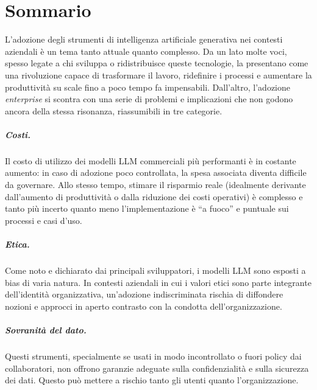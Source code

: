 
\chapter*{Sommario}

L'adozione degli strumenti di intelligenza artificiale generativa nei contesti
aziendali è un tema tanto attuale quanto complesso. Da un lato molte voci, 
spesso legate a chi sviluppa o ridistribuisce queste tecnologie, la
presentano come una rivoluzione capace di trasformare il lavoro, ridefinire i
processi e aumentare la produttività su scale fino a poco tempo fa impensabili.
Dall'altro, l'adozione \emph{enterprise} si scontra con una serie di problemi e
implicazioni che non godono ancora della stessa risonanza, riassumibili in tre categorie.

\paragraph{Costi.} Il costo di utilizzo dei modelli LLM commerciali più
performanti è in costante aumento: in caso di adozione poco controllata, la spesa
associata diventa difficile da governare. Allo stesso tempo, stimare il risparmio
reale (idealmente derivante dall'aumento di produttività o dalla riduzione dei costi
operativi) è complesso e tanto più incerto quanto meno
l'implementazione è ``a fuoco'' e puntuale sui processi e casi d'uso.

\paragraph{Etica.} Come noto e dichiarato dai principali sviluppatori, i modelli LLM sono
esposti a bias di varia natura. In contesti aziendali in cui i valori etici sono
parte integrante dell'identità organizzativa, un'adozione indiscriminata rischia
di diffondere nozioni e approcci in aperto contrasto con la condotta
dell'organizzazione.

\paragraph{Sovranità del dato.} Questi strumenti, specialmente se usati in modo
incontrollato o fuori policy dai collaboratori, non offrono garanzie adeguate sulla
confidenzialità e sulla sicurezza dei dati. Questo può mettere a rischio tanto gli utenti
quanto l'organizzazione.

